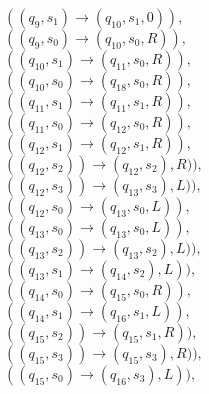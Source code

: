 \documentclass[a4paper]{article} %
\begin{document}
\begin{center}
\begin{varwidth}{\textwidth}
\begin{tasks}[label={},label-width={1cm}]
                $((q_{9}, s_{1}) \to (q_{10}, s_{1}, 0)),$\\
                $((q_{9}, s_{0}) \to (q_{10}, s_{0}, R)),$\\
                $((q_{10}, s_{1}) \to (q_{11}, s_{0}, R)),$\\
                $((q_{10}, s_{0}) \to (q_{18}, s_{0}, R)),$\\
                $((q_{11}, s_{1}) \to (q_{11}, s_{1}, R)),$\\
                $((q_{11}, s_{0}) \to (q_{12}, s_{0}, R)),$\\
                $((q_{12}, s_{1}) \to (q_{12}, s_{1}, R)),$\\
                $((q_{12}, s_{2})) \to (q_{12}, s_{2}), R)),$\\
                $((q_{12}, s_{3})) \to (q_{13}, s_{3}), L)),$\\
                $((q_{12}, s_{0}) \to (q_{13}, s_{0}, L)),$\\
                $((q_{13}, s_{0}) \to (q_{13}, s_{0}, L)),$\\
                $((q_{13}, s_{2})) \to (q_{13}, s_{2}), L)),$\\
                $((q_{13}, s_{1}) \to (q_{14}, s_{2}), L)),$\\
                $((q_{14}, s_{0}) \to (q_{15}, s_{0}, R)),$\\
                $((q_{14}, s_{1}) \to (q_{16}, s_{1}, L)),$\\
                $((q_{15}, s_{2})) \to (q_{15}, s_{1}, R)),$\\
                $((q_{15}, s_{3})) \to (q_{15}, s_{3}), R)),$\\
                $((q_{15}, s_{0}) \to (q_{16}, s_{3}), L)),$\\


\end{tasks}
\end{varwidth}
\end{center}
\end{document}
